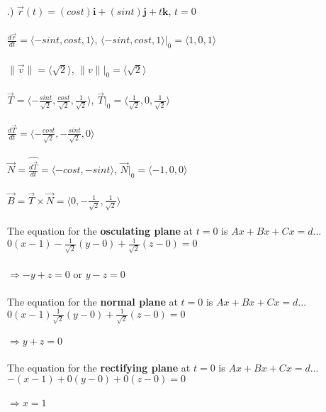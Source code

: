 \documentclass[12pt]{article}
\begin{document}
.) $\vec{r}(t) = (cos{t})\mathbf{i} + (sin{t})\mathbf{j} + t\mathbf{k}$, \hspace{10pt} $t = 0$\\\\
\noindent $\frac{d\vec{r}}{dt} = \langle -sin{t}, cos{t}, 1\rangle$,
 \hspace{10pt} $\langle -sin{t}, cos{t}, 1\rangle \Big|_{0} = \langle 1, 0, 1\rangle$\\\\
\noindent $\| \vec{v} \| = \langle \sqrt{2}\rangle$, \hspace{10pt} $\| v \| \Big|_{0} = \langle \sqrt{2} \rangle$\\\\
\noindent $\vec{T} = \langle -\frac{sin{t}}{\sqrt{2}}, \frac{cos{t}}{\sqrt{2}}, \frac{1}{\sqrt{2}}\rangle$,
 \hspace{10pt} $\vec{T}\Big|_{0} = \langle \frac{1}{\sqrt{2}}, 0, \frac{1}{\sqrt{2}}\rangle$\\\\
\noindent $\frac{d\vec{T}}{dt} = \langle -\frac{cos{t}}{\sqrt{2}}, -\frac{sin{t}}{\sqrt{2}}, 0 \rangle$\\\\
\noindent $\vec{N} = \hat{\frac{d\vec{T}}{dt}} = \langle -cos{t}, -sin{t}\rangle$, \hspace{10pt}
 $\vec{N}\Big|_{0} = \langle -1, 0, 0\rangle$\\\\
\noindent $\vec{B} = \vec{T} \times \vec{N} = \langle 0, -\frac{1}{\sqrt{2}}, \frac{1}{\sqrt{2}}\rangle$\\\\
\noindent The equation for the \textbf{osculating plane} at $t = 0$ is $Ax + Bx + Cx  = d$...
$0(x - 1) - \frac{1}{\sqrt{2}}(y - 0) + \frac{1}{\sqrt{2}} (z - 0) = 0$\\\\
\noindent $\Rightarrow -y+z = 0$ or $y - z = 0$\\\\ 
\noindent The equation for the \textbf{normal plane} at $t = 0$ is $ Ax + Bx + Cx  = d$...
$0(x - 1)  \frac{1}{\sqrt{2}}(y - 0) + \frac{1}{\sqrt{2}} (z - 0) = 0$\\\\
\noindent $\Rightarrow y+z = 0$\\\\ 
\noindent The equation for the \textbf{rectifying plane} at $t = 0$ is $ Ax + Bx + Cx  = d$...
$-(x - 1) + 0(y - 0) + 0(z - 0) = 0$\\\\
\noindent $\Rightarrow x = 1$\\\\ 
\end{document}
